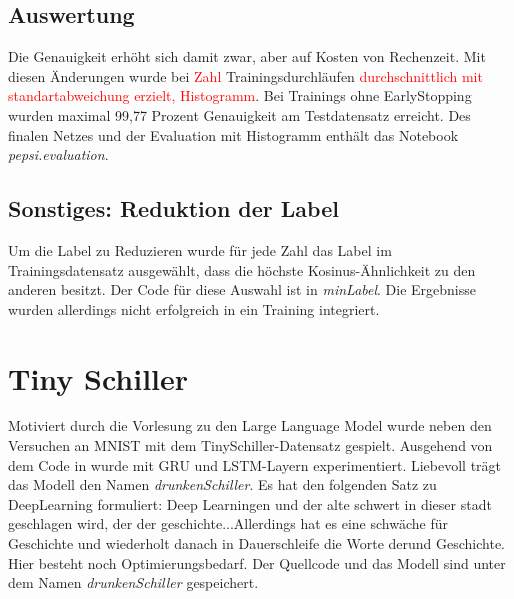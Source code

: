 \documentclass[
fontsize=12pt,					%
paper=a4,						%
twoside=false, 					%
listof=totoc, 					%
bibliography=totoc,				%
titlepage, 						%
headsepline, 					%
DIV=12,							%
BCOR=6mm,						%
cleardoublepage=empty,			%
parskip,							%
ngerman
]{scrartcl}
\begin{document}
\subsection{Auswertung}

Die Genauigkeit erhöht sich damit zwar, aber auf Kosten von Rechenzeit. Mit diesen Änderungen wurde bei \textcolor{red}{Zahl} Trainingsdurchläufen \textcolor{red}{durchschnittlich mit standartabweichung erzielt, Histogramm}.
Bei Trainings ohne EarlyStopping wurden maximal 99,77 Prozent Genauigkeit am Testdatensatz erreicht. Des finalen Netzes und der Evaluation mit Histogramm enthält das Notebook \emph{pepsi.evaluation}.


\subsection{Sonstiges: Reduktion der Label}

Um die Label zu Reduzieren wurde für jede Zahl das Label im Trainingsdatensatz ausgewählt, dass die höchste Kosinus-Ähnlichkeit zu den anderen besitzt. Der Code für diese Auswahl ist in \emph{minLabel}. Die Ergebnisse wurden allerdings nicht erfolgreich in ein Training integriert.

\section{Tiny Schiller}

Motiviert durch die Vorlesung zu den Large Language Model wurde neben den Versuchen an MNIST mit dem TinySchiller-Datensatz \autocite{Schutera.2023} \glqq gespielt\grqq. Ausgehend von dem Code in \autocite{Bansal.2021} wurde mit GRU und LSTM-Layern experimentiert. Liebevoll trägt das Modell den Namen \emph{drunkenSchiller}. Es hat den folgenden Satz zu DeepLearning formuliert: \glqq Deep Learningen und der alte schwert in dieser stadt geschlagen wird, der der geschichte...\grqq Allerdings hat es eine schwäche für Geschichte und wiederholt danach in Dauerschleife die Worte \glqq der\grqq und \glqq Geschichte\grqq. Hier besteht noch Optimierungsbedarf. Der Quellcode und das Modell sind unter dem Namen \emph{drunkenSchiller} gespeichert.

\clearpage
\printbibliography
\end{document}
